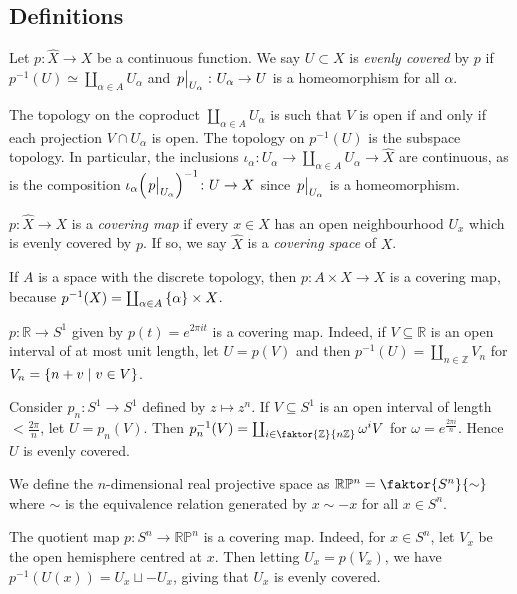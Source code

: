 \subsection{Definitions}
\begin{definition}
	Let \( p : \hat X \to X \) be a continuous function.
	We say \( U \subset X \) is \emph{evenly covered} by \( p \) if \( p^{-1}(U) \simeq \coprod_{\alpha \in A} U_\alpha \) and \( \eval{p}_{U_\alpha} \colon U_\alpha \to U \) is a homeomorphism for all \( \alpha \).
\end{definition}
The topology on the coproduct \( \coprod_{\alpha \in A} U_\alpha \) is such that \( V \) is open if and only if each projection \( V \cap U_\alpha \) is open.
The topology on \( p^{-1}(U) \) is the subspace topology.
In particular, the inclusions \( \iota_\alpha \colon U_\alpha \to \coprod_{\alpha \in A} U_\alpha \to \hat X \) are continuous, as is the composition \( \iota_\alpha \qty(\eval{p}_{U_\alpha})^{-1} \colon U \to X \) since \( \eval{p}_{U_\alpha} \) is a homeomorphism.
\begin{definition}
	\( p \colon \hat X \to X \) is a \emph{covering map} if every \( x \in X \) has an open neighbourhood \( U_x \) which is evenly covered by \( p \).
	If so, we say \( \hat X \) is a \emph{covering space} of \( X \).
\end{definition}
\begin{example}
	If \( A \) is a space with the discrete topology, then \( p \colon A \times X \to X \) is a covering map, because \( p^{-1}(X) = \coprod_{\alpha \in A} \qty{\alpha} \times X \).
\end{example}
\begin{example}
	\( p \colon \mathbb R \to S^1 \) given by \( p(t) = e^{2\pi i t} \) is a covering map.
	Indeed, if \( V \subseteq \mathbb R \) is an open interval of at most unit length, let \( U = p(V) \) and then \( p^{-1}(U) = \coprod_{n \in \mathbb Z} V_n \) for \( V_n = \qty{n + v \mid v \in V} \).
\end{example}
\begin{example}
	Consider \( p_n \colon S^1 \to S^1 \) defined by \( z \mapsto z^n \).
	If \( V \subseteq S^1 \) is an open interval of length \( <\frac{2\pi}{n} \), let \( U = p_n(V) \).
	Then \( p_n^{-1}(V) = \coprod_{i \in \faktor{\mathbb Z}{n\mathbb Z}} \omega^i V \) for \( \omega = e^{\frac{2\pi i}{n}} \).
	Hence \( U \) is evenly covered.
\end{example}
\begin{definition}
	We define the \( n \)-dimensional real projective space as \( \mathbb R\mathbb P^n = \faktor{S^n}{\sim} \) where \( \sim \) is the equivalence relation generated by \( x \sim -x \) for all \( x \in S^n \).
\end{definition}
\begin{example}
	The quotient map \( p \colon S^n \to \mathbb R\mathbb P^n \) is a covering map.
	Indeed, for \( x \in S^n \), let \( V_x \) be the open hemisphere centred at \( x \).
	Then letting \( U_x = p(V_x) \), we have \( p^{-1}(U(x)) = U_x \sqcup -U_x \), giving that \( U_x \) is evenly covered.
\end{example}

